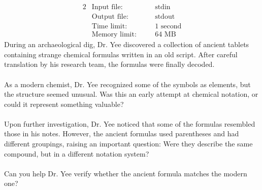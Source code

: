 \documentclass[12pt,a4paper]{article}
\begin{document}
\begin{alignat*} {2}
 &   \text{Input file:}   \quad     &&\text{stdin}\\
 &   \text{Output file:}  \quad     &&\text{stdout}\\
 &   \text{Time limit:}   \quad     &&\text{1 second}\\
 &   \text{Memory limit:} \quad     &&\text{64 MB}
\end{alignat*}
\noindent
During an archaeological dig, Dr. Yee discovered a collection of ancient tablets containing strange chemical formulas written in an old script. After careful translation by his research team, the formulas were finally decoded.
\\\\
\noindent
As a modern chemist, Dr. Yee recognized some of the symbols as elements, but the structure seemed unusual. Was this an early attempt at chemical notation, or could it represent something valuable?
\\\\
\noindent
Upon further investigation, Dr. Yee noticed that some of the formulas resembled those in his notes. However, the ancient formulas used parentheses and had different groupings, raising an important question: Were they describe the same compound, but in a different notation system?
\\\\
\noindent
Can you help Dr. Yee verify whether the ancient formula matches the modern one?
\end{document}

